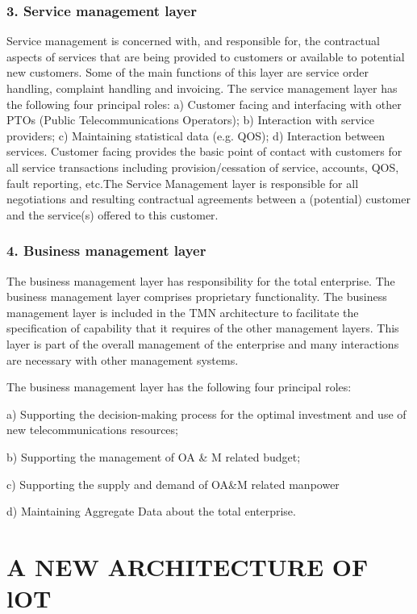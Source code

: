 \documentclass{article}
\begin{document}
\subsubsection{3. Service management layer}

Service management is concerned with, and responsible for, the contractual aspects of services that are being provided to customers or available to potential new customers. Some of the main functions of this layer are service order handling, complaint handling and invoicing.
The service management layer has the following four principal roles:
a) Customer facing and interfacing with other PTOs (Public Telecommunications Operators); 
b) Interaction with service providers;
c) Maintaining statistical data (e.g. QOS);
d) Interaction between services.
Customer facing provides the basic point of contact with
customers for all service transactions including provision/cessation of service, accounts, QOS, fault reporting, etc.The Service Management layer is responsible for all negotiations and resulting contractual agreements between a (potential) customer and the service(s) offered to this customer.

\subsubsection{4. Business management layer}

The business management layer has responsibility for the total enterprise. The business management layer comprises proprietary functionality. The business management layer is included in the TMN architecture to facilitate the specification of capability that it requires of the other management layers. This layer is part of the overall management of the enterprise and many interactions are necessary with other management systems.

The business management layer has the following four principal roles:

a) Supporting the decision-making process for the optimal investment and use of new
telecommunications resources;

b) Supporting the management of OA & M related budget;

c) Supporting the supply and demand of OA&M related manpower

d) Maintaining Aggregate Data about the total enterprise. 

\section{A NEW ARCHITECTURE OF lOT}
\end{document}
